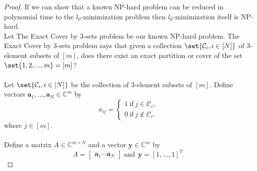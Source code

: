 \begin{proof}
If we can show that a known NP-hard problem can be reduced in polynomial time to the $l_0$-minimization problem then $l_0$-minimization itself is NP-hard. 
\\Let The Exact Cover by 3-sets problem be our known NP-hard problem. The Exact Cover by 3-sets problem says that given a collection  $\set{\mathcal{C}_i, i \in [N]}$ of 3-element subsets of $[m]$, does there exist an exact partition or cover of the set $\set{1,2,...,m} = [m]$?
\\
\\ Let $\set{\mathcal{C}_i, i \in [N]}$ be the collection of 3-element subsets of $[m]$. Define vectors $\mathbf{a}_1,...,\mathbf{a}_N \in  \mathbb{C}^m$ by
\begin{equation*}
a_{ij} = 
\begin{cases} 
      1 \ \text{if} \  j \in \mathcal{C}_i, \\
      0 \ \text{if} \  j \notin \mathcal{C}_i.
\end{cases}
\end{equation*}
where $j \in [m]$.
\\
\\Define a matrix $A \in \mathbb{C}^{m \times N}$ and a vector $\mathbf{y} \in \mathbb{C}^m$ by
\begin{equation*}
A = 
\begin{bmatrix}
\mathbf{a}_1 \cdots \mathbf{a}_N 
\end{bmatrix}
\ \text{and} \ \ \mathbf{y} = [1,...,1]^{T} .
\end{equation*}


\end{proof}
